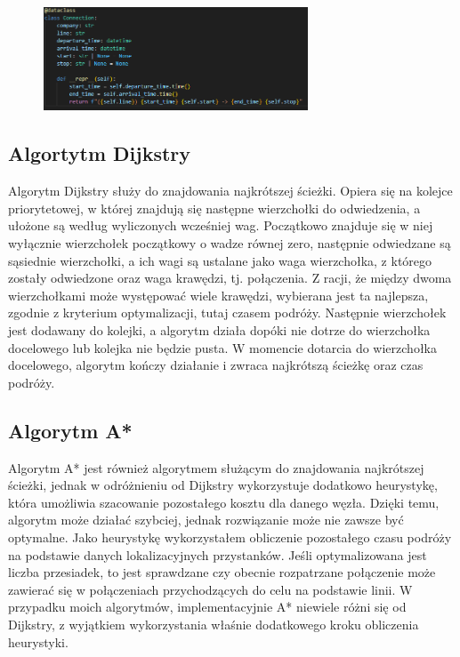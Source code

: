 \documentclass{article}
\begin{document}
\begin{figure}[H]
    \centering
    \includegraphics[width=0.7\textwidth]{sc2.png}
\end{figure}



\subsection*{Algortytm Dijkstry}
Algorytm Dijkstry służy do znajdowania najkrótszej ścieżki. Opiera się na kolejce priorytetowej, w której znajdują się następne wierzchołki do odwiedzenia, a ułożone są według wyliczonych wcześniej wag. Początkowo
znajduje się w niej wyłącznie wierzchołek początkowy o wadze równej zero, następnie odwiedzane są sąsiednie wierzchołki, a ich wagi są ustalane jako waga wierzchołka, z którego zostały odwiedzone oraz waga krawędzi, tj. połączenia. Z racji, że
między dwoma wierzchołkami może występować wiele krawędzi, wybierana jest ta najlepsza, zgodnie z kryterium optymalizacji, tutaj czasem podróży. Następnie wierzchołek jest dodawany do kolejki, a algorytm działa dopóki
nie dotrze do wierzchołka docelowego lub kolejka nie będzie pusta. W momencie dotarcia do wierzchołka docelowego, algorytm kończy działanie i zwraca najkrótszą ścieżkę oraz czas podróży.


\subsection*{Algorytm A*}
Algorytm A* jest również algorytmem służącym do znajdowania najkrótszej ścieżki, jednak w odróżnieniu od Dijkstry wykorzystuje dodatkowo heurystykę,
która umożliwia szacowanie pozostałego kosztu dla danego węzła. Dzięki temu, algorytm może działać szybciej, jednak rozwiązanie może nie zawsze być optymalne.
Jako heurystykę wykorzystałem obliczenie pozostałego czasu podróży na podstawie danych lokalizacyjnych przystanków. Jeśli optymalizowana jest liczba przesiadek, to jest sprawdzane czy
obecnie rozpatrzane połączenie może zawierać się w połączeniach przychodzących do celu na podstawie linii. W przypadku moich algorytmów, implementacyjnie A* niewiele różni się od Dijkstry, z wyjątkiem wykorzystania właśnie dodatkowego kroku
obliczenia heurystyki.
\end{document}
